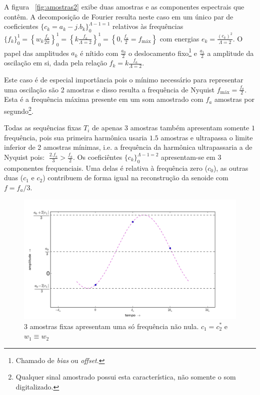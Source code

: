 A figura ~\ref{fig:amostras2} exibe duas amostras e as componentes espectrais que contêm. A decomposição de Fourier resulta neste caso em um único par de coeficientes $\{c_k=a_k-j.b_k\}_0^{\Lambda-1=1}$ relativos às frequências $\{f_k\}_0^1=\left\{w_k\frac{f_a}{2\pi}\right\}_0^1=\left\{k\frac{f_a}{\Lambda=2}\right\}_0^1=\left\{0,\frac{f_a}{2}=f_{\text{máx}}\right\}$
com energias $e_k=\frac{(c_k)^2}{\Lambda=2}$. O papel das amplitudes $a_k$ é nítido com
 $\frac{a_0}{2}$ o deslocamento fixo\footnote{Chamado de \emph{bias} ou \emph{offset}.} e $\frac{a_1}{2}$ a amplitude da oscilação em si, dada pela relação $f_k=k \frac{f_a}{\Lambda=2}$.

Este caso é de especial importância pois o mínimo necessário para representar uma oscilação são 2 amostras e disso resulta a frequência de Nyquist $f_{\text{máx}}=\frac{f_a}{2}$. Esta é a frequência máxima presente em um som amostrado com $f_a$ amostras por segundo\footnote{Qualquer sinal amostrado possui esta característica, não somente o som digitalizado.}.

Todas as sequências fixas $T_i$ de apenas $3$ amostras também apresentam
somente $1$ frequência, pois sua primeira harmônica usaria $1.5$ amostras e ultrapassa o limite inferior de 2 amostras mínimas, i.e. a frequência da harmônica ultrapassaria a de Nyquist pois:  $\; \frac{2. f_a}{3} > \frac{f_a}{2} $. 
Os coeficiêntes $\{c_k\}_0^{\Lambda-1=2}$ apresentam-se em 
3 componentes frequenciais. Uma delas é relativa à frequência zero ($c_0$), as outras duas ($c_1$ e $c_2$) contribuem de forma igual na reconstrução da senoide com $f=f_a/3$.

\begin{figure}[h!]
    \centering
        \includegraphics[width=\textwidth]{figuras/amostras3b}
    \caption{3 amostras fixas apresentam uma só frequência não nula. $c_1=c_2^*$ e $w_1 \equiv w_2$}
        \label{fig:amostras3}
\end{figure}



